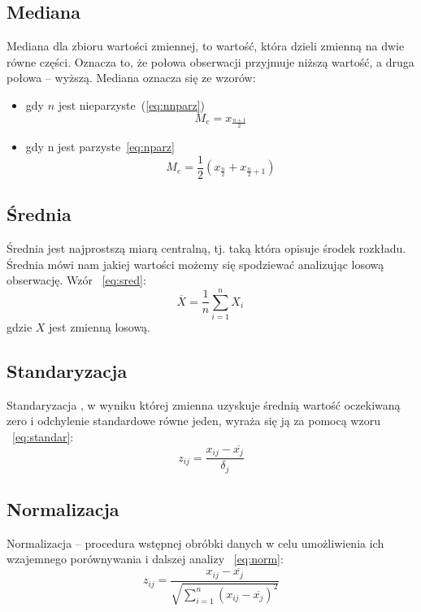 \documentclass{article}
\begin{document}
\subsection{Mediana}
Mediana  dla zbioru wartości zmiennej, to wartość, która dzieli zmienną na dwie równe części. Oznacza to, że połowa obserwacji przyjmuje niższą wartość, a druga połowa -- wyższą. Mediana oznacza się ze wzorów:
\begin{itemize}
    \item gdy $n$ jest nieparzyste~(\ref{eq:nnparz})
    \begin{equation}
        M_e = x_{\frac{n+1}{2}}
        \label{eq:nnparz}
    \end{equation}
    \item gdy n jest parzyste~\ref{eq:nparz}
    \begin{equation}
        M_e = \frac{1}{2}(x_{\frac{n}{2}} + x_{\frac{n}{2}+1})
        \label{eq:nparz}
    \end{equation}
\end{itemize}
\subsection{Średnia}
Średnia  jest najprostszą miarą centralną, tj. taką która opisuje środek rozkładu. Średnia mówi nam jakiej wartości możemy się spodziewać analizując losową obserwację. Wzór ~\ref{eq:sred}:
\begin{equation}
     \overline{X} = \frac{1}{n}\sum_{i=1}^{n}X_i \,
     \label{eq:sred}
 \end{equation}
 gdzie $X$ jest zmienną losową.


 \subsection{Standaryzacja}
 Standaryzacja , w wyniku której zmienna uzyskuje średnią wartość oczekiwaną zero i odchylenie standardowe równe jeden, wyraża się ją za pomocą wzoru ~\ref{eq:standar}:
 \begin{equation}
     z_{ij} = \frac{x_{ij}-\overline{x_j}}{\delta_j}
     \label{eq:standar}
 \end{equation}
 \subsection{Normalizacja}
 Normalizacja  – procedura wstępnej obróbki danych w celu umożliwienia ich wzajemnego porównywania i dalszej analizy ~\ref{eq:norm}:
 \begin{equation}
     z_{ij} = \frac{x_{ij}-\overline{x_j}}{\sqrt{\sum_{i=1}^{n}(x_{ij}-\overline{x_j})^2}}
     \label{eq:norm}
 \end{equation}
\end{document}
